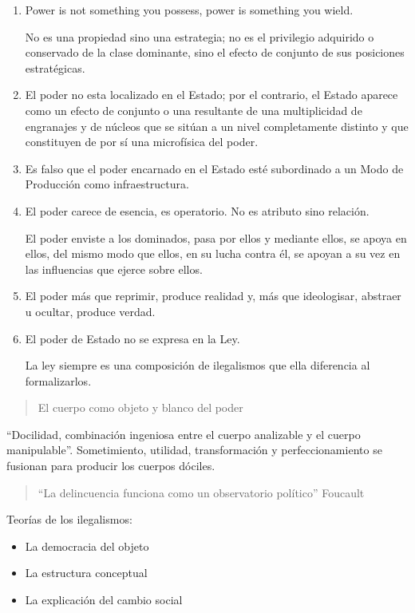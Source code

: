 \documentclass[
  letterpaper,
  DIV=11,
  numbers=noendperiod]{scrreprt}
\begin{document}
\begin{enumerate}
\def\labelenumi{\arabic{enumi}.}
\item
  Power is not something you possess, power is something you wield.

  No es una propiedad sino una estrategia; no es el privilegio adquirido
  o conservado de la clase dominante, sino el efecto de conjunto de sus
  posiciones estratégicas.
\item
  El poder no esta localizado en el Estado; por el contrario, el Estado
  aparece como un efecto de conjunto o una resultante de una
  multiplicidad de engranajes y de núcleos que se sitúan a un nivel
  completamente distinto y que constituyen de por sí una microfísica del
  poder.
\item
  Es falso que el poder encarnado en el Estado esté subordinado a un
  Modo de Producción como infraestructura.
\item
  El poder carece de esencia, es operatorio. No es atributo sino
  relación.

  El poder enviste a los dominados, pasa por ellos y mediante ellos, se
  apoya en ellos, del mismo modo que ellos, en su lucha contra él, se
  apoyan a su vez en las influencias que ejerce sobre ellos.
\item
  El poder más que reprimir, produce realidad y, más que ideologisar,
  abstraer u ocultar, produce verdad.
\item
  El poder de Estado no se expresa en la Ley.

  La ley siempre es una composición de ilegalismos que ella diferencia
  al formalizarlos.
\end{enumerate}

\begin{quote}
El cuerpo como objeto y blanco del poder
\end{quote}

``Docilidad, combinación ingeniosa entre el cuerpo analizable y el
cuerpo manipulable''. Sometimiento, utilidad, transformación y
perfeccionamiento se fusionan para producir los cuerpos dóciles.

\begin{quote}
``La delincuencia funciona como un observatorio político'' Foucault
\end{quote}

Teorías de los ilegalismos:

\begin{itemize}
\item
  La democracia del objeto
\item
  La estructura conceptual
\item
  La explicación del cambio social
\end{itemize}
\end{document}
